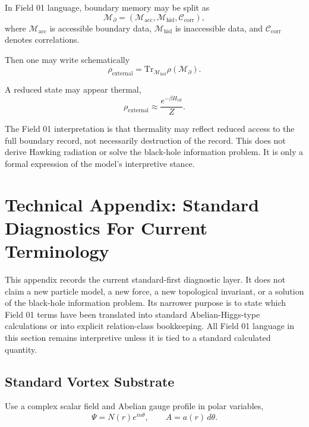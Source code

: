 \documentclass[11pt,a4paper]{article}
\newcommand{\memory}{\mathcal{M}}
\newcommand{\boundary}{\partial}
\begin{document}
In Field 01 language, boundary memory may be split as
\begin{equation}
\memory_{\boundary}
=(\memory_{\mathrm{acc}},\memory_{\mathrm{hid}},\mathcal{C}_{\mathrm{corr}}),
\end{equation}
where $\memory_{\mathrm{acc}}$ is accessible boundary data, $\memory_{\mathrm{hid}}$ is inaccessible data, and $\mathcal{C}_{\mathrm{corr}}$ denotes correlations.

Then one may write schematically
\begin{equation}
\rho_{\mathrm{external}}
=\mathrm{Tr}_{\memory_{\mathrm{hid}}}\rho(\memory_{\boundary}).
\end{equation}

A reduced state may appear thermal,
\begin{equation}
\rho_{\mathrm{external}}\approx\frac{e^{-\beta H_{\mathrm{eff}}}}{Z}.
\end{equation}

The Field 01 interpretation is that thermality may reflect reduced access to the full boundary record, not necessarily destruction of the record. This does not derive Hawking radiation or solve the black-hole information problem. It is only a formal expression of the model's interpretive stance.

\section{Technical Appendix: Standard Diagnostics For Current Terminology}

This appendix records the current standard-first diagnostic layer. It does not claim a new particle model, a new force, a new topological invariant, or a solution of the black-hole information problem. Its narrower purpose is to state which Field 01 terms have been translated into standard Abelian-Higgs-type calculations or into explicit relation-class bookkeeping. All Field 01 language in this section remains interpretive unless it is tied to a standard calculated quantity.

\subsection{Standard Vortex Substrate}

Use a complex scalar field and Abelian gauge profile in polar variables,
\begin{equation}
\Psi=N(r)e^{in\theta},
\qquad
A=a(r)\,d\theta.
\end{equation}
\end{document}
